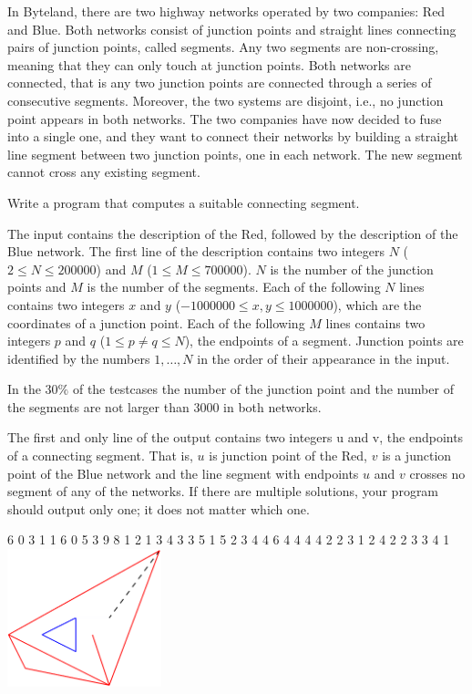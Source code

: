 





In Byteland, there are two highway networks operated by two companies: Red and Blue. Both networks consist of junction points and straight lines connecting pairs of junction points, called segments. Any two segments are non-crossing, meaning that they can only touch at junction points. Both networks are connected, that is any two junction points are connected through a series of consecutive segments. Moreover, the two systems are disjoint, i.e., no junction point appears in both networks.
The two companies have now decided to fuse into a single one, and they want to connect their networks by building a straight line segment between two junction points, one in each network. The new segment cannot cross any existing segment.

Write a program that computes a suitable connecting segment.

The input contains the description of the Red, followed by the description of the Blue network. The first line of the description contains two integers $N$ ($2 \leq N \leq 200000$) and $M$ ($1 \leq M \leq 700000$). $N$ is the number of the junction points and $M$ is the number of the segments. Each of the following $N$ lines contains two integers $x$ and $y$ ($-1000000 \leq x,y \leq 1000000$), which are the coordinates of a junction point. Each of the following $M$ lines contains two integers $p$ and $q$ ($1\leq p \neq q \leq N$), the endpoints of a segment. Junction points are identified by the numbers $1,\ldots,N$ in the order of their appearance in the input.

\bigskip
In the $30\%$ of the testcases the number of the junction point and the number of the segments are not larger than $3 000$ in both networks.

The first and only line of the output contains two integers u and v, the endpoints of a connecting segment. That is, $u$ is junction point of the Red, $v$ is a junction point of the Blue network and the line segment with endpoints $u$ and $v$ crosses no segment of any of the networks. If there are multiple solutions, your program should output only one; it does not matter which one.


 6
0 3
1 1
6 0
5 3
9 8
1 2
1 3
4 3
3 5
1 5
2 3
4 4
6 4
4 4
4 2
2 3
1 2
4 2
2 3
3 4
 1
\sampleCOMMENT
\includegraphics[height=4cm]{img/fig11.pdf}
\sampleEND


